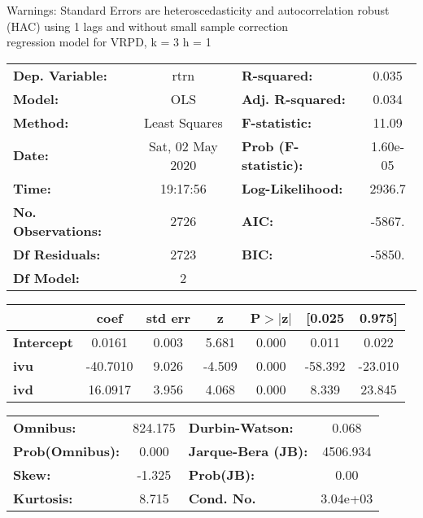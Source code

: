 Warnings: \newline
 [1] Standard Errors are heteroscedasticity and autocorrelation robust (HAC) using 1 lags and without small sample correction\\ 

regression model for VRPD, k = 3 h = 1\begin{center}
\begin{tabular}{lclc}
\toprule
\textbf{Dep. Variable:}    &       rtrn       & \textbf{  R-squared:         } &     0.035   \\
\textbf{Model:}            &       OLS        & \textbf{  Adj. R-squared:    } &     0.034   \\
\textbf{Method:}           &  Least Squares   & \textbf{  F-statistic:       } &     11.09   \\
\textbf{Date:}             & Sat, 02 May 2020 & \textbf{  Prob (F-statistic):} &  1.60e-05   \\
\textbf{Time:}             &     19:17:56     & \textbf{  Log-Likelihood:    } &    2936.7   \\
\textbf{No. Observations:} &        2726      & \textbf{  AIC:               } &    -5867.   \\
\textbf{Df Residuals:}     &        2723      & \textbf{  BIC:               } &    -5850.   \\
\textbf{Df Model:}         &           2      & \textbf{                     } &             \\
\bottomrule
\end{tabular}
\begin{tabular}{lcccccc}
                   & \textbf{coef} & \textbf{std err} & \textbf{z} & \textbf{P$> |$z$|$} & \textbf{[0.025} & \textbf{0.975]}  \\
\midrule
\textbf{Intercept} &       0.0161  &        0.003     &     5.681  &         0.000        &        0.011    &        0.022     \\
\textbf{ivu}       &     -40.7010  &        9.026     &    -4.509  &         0.000        &      -58.392    &      -23.010     \\
\textbf{ivd}       &      16.0917  &        3.956     &     4.068  &         0.000        &        8.339    &       23.845     \\
\bottomrule
\end{tabular}
\begin{tabular}{lclc}
\textbf{Omnibus:}       & 824.175 & \textbf{  Durbin-Watson:     } &    0.068  \\
\textbf{Prob(Omnibus):} &   0.000 & \textbf{  Jarque-Bera (JB):  } & 4506.934  \\
\textbf{Skew:}          &  -1.325 & \textbf{  Prob(JB):          } &     0.00  \\
\textbf{Kurtosis:}      &   8.715 & \textbf{  Cond. No.          } & 3.04e+03  \\
\bottomrule
\end{tabular}
\end{center}

